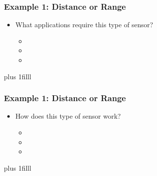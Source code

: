 \documentclass[fleqn]{beamer} %
\newcommand{\sectionIsubsectionIItitle}{Example 1: Distance or Range}
\newcommand{\btVFill}{\vskip0pt plus 1filll}
\begin{document}
			\begin{frame}
				\frametitle{\sectionIsubsectionIItitle}

				\begin{itemize}
					\item What applications require this type of sensor?
					\begin{itemize}
						\item \vspace{5mm}
						\item \vspace{5mm}
						\item \vspace{5mm}	
					\end{itemize}
				\end{itemize}
				
				\btVFill
			\end{frame}

			\begin{frame}
				\frametitle{\sectionIsubsectionIItitle}
				\begin{itemize}
					\item How does this type of sensor work?
					\begin{itemize}
						\item \vspace{5mm}
						\item \vspace{5mm}
						\item \vspace{5mm}	
					\end{itemize}
				\end{itemize}
				
				\btVFill

			\end{frame}


\end{document}
